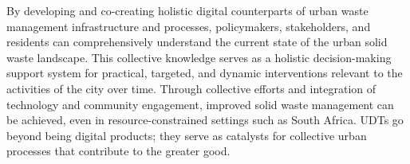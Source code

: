 \documentclass[authoryear,preprint,review,11pt,doubleblind]{elsarticle}
\begin{document}

     By developing and co-creating holistic digital counterparts of urban waste management infrastructure and processes, policymakers, stakeholders, and residents can comprehensively understand the current state of the urban solid waste landscape. This collective knowledge serves as a holistic decision-making support system for practical, targeted, and dynamic interventions relevant to the activities of the city over time. Through collective efforts and integration of technology and community engagement, improved solid waste management can be achieved, even in resource-constrained settings such as South Africa. UDTs go beyond being digital products; they serve as catalysts for collective urban processes that contribute to the greater good.


     
    
    \appendix \label{appendix}
    
\end{document}
